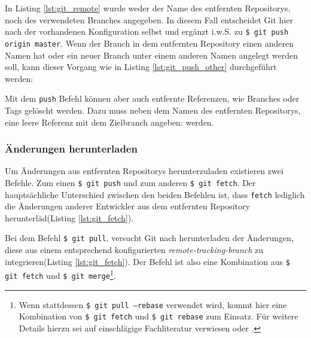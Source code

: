 
In Listing \ref{lst:git_remote} wurde weder der Name des entfernten Repositorys,
noch des verwendeten Branches angegeben. In diesem Fall entscheidet Git hier
nach der vorhandenen Konfiguration selbst und ergänzt i.w.S. zu \texttt{\$ git
push origin master}. Wenn der Branch in dem entfernten Repository einen anderen
Namen hat oder ein neuer Branch unter einem anderen Namen angelegt werden soll,
kann dieser Vorgang wie in Listing \ref{lst:git_push_other} durchgeführt werden:


Mit dem \texttt{push} Befehl können aber auch entfernte Referenzen, wie
Branches oder Tags gelöscht werden. Dazu muss neben dem Namen des entfernten
Repositorys, eine leere Referenz mit dem Zielbranch angeben:
werden.\cite[S.~153-155]{gitosp}


\subsubsection{Änderungen herunterladen}
Um Änderungen aus entfernten Repositorys herunterzuladen existieren zwei
Befehle. Zum einen \texttt{\$ git push} und zum anderen \texttt{\$ git fetch}.
Der hauptsächliche Unterschied zwischen den beiden Befehlen ist, dass
\texttt{fetch} lediglich die Änderungen anderer Entwickler aus dem entfernten
Repository herunterläd(Listing \ref{lst:git_fetch}).


Bei dem Befehl \texttt{\$ git pull}, versucht Git nach herunterladen der
Änderungen, diese aus einem entsprechend konfigurierten
\textit{remote-tracking-branch} zu integrieren(Listing \ref{lst:git_fetch}).
Der Befehl ist also eine Kombination aus \texttt{\$ git fetch} und \texttt{\$
git merge}\footnote{Wenn stattdessen \texttt{\$ git pull --rebase} verwendet
wird, kommt hier eine Kombination von \texttt{\$ git fetch} und \texttt{\$ git
rebase} zum Einsatz. Für weitere Details hierzu sei auf einschlägige
Fachliteratur verwiesen \cite[144-152]{gitosp} oder
\cite[85-88]{progit}.}.\cite[144-152]{gitosp}


